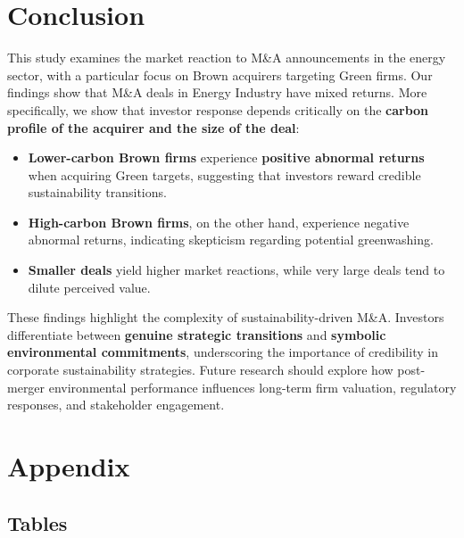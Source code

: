 \documentclass[a4paper]{article}
\begin{document}
\section{Conclusion}
This study examines the market reaction to M\&A announcements in the energy sector, with a particular focus on Brown acquirers targeting Green firms. Our findings show that M\&A deals in Energy Industry have mixed returns. More specifically, we show that investor response depends critically on the \textbf{carbon profile of the acquirer and the size of the deal}:

\begin{itemize}
    \item \textbf{Lower-carbon Brown firms} experience \textbf{positive abnormal returns} when acquiring Green targets, suggesting that investors reward credible sustainability transitions.
    
    \item \textbf{High-carbon Brown firms}, on the other hand, experience negative abnormal returns, indicating skepticism regarding potential greenwashing.
    
    \item \textbf{Smaller deals} yield higher market reactions, while very large deals tend to dilute perceived value.
\end{itemize}

These findings highlight the complexity of sustainability-driven M\&A. Investors differentiate between \textbf{genuine strategic transitions} and \textbf{symbolic environmental commitments}, underscoring the importance of credibility in corporate sustainability strategies. Future research should explore how post-merger environmental performance influences long-term firm valuation, regulatory responses, and stakeholder engagement.

\printbibliography

\newpage
\appendix
\section{Appendix}

\subsection{Tables}
\end{document}
